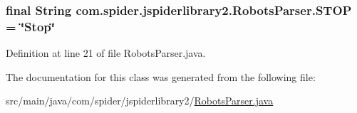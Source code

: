 \hypertarget{classcom_1_1spider_1_1jspiderlibrary2_1_1_robots_parser_aff7a48bec0d0fa25e624afcc60144f32}{
\subsubsection[{\-S\-T\-O\-P}]{\setlength{\rightskip}{0pt plus 5cm}final \-String {\bf com.\-spider.\-jspiderlibrary2.\-Robots\-Parser.\-S\-T\-O\-P} = \char`\"{}\-Stop\char`\"{}}}\label{classcom_1_1spider_1_1jspiderlibrary2_1_1_robots_parser_aff7a48bec0d0fa25e624afcc60144f32}


\-Definition at line 21 of file \-Robots\-Parser.\-java.



\-The documentation for this class was generated from the following file\-:\begin{DoxyCompactItemize}
\item 
src/main/java/com/spider/jspiderlibrary2/\hyperlink{_robots_parser_8java}{\-Robots\-Parser.\-java}\end{DoxyCompactItemize}
